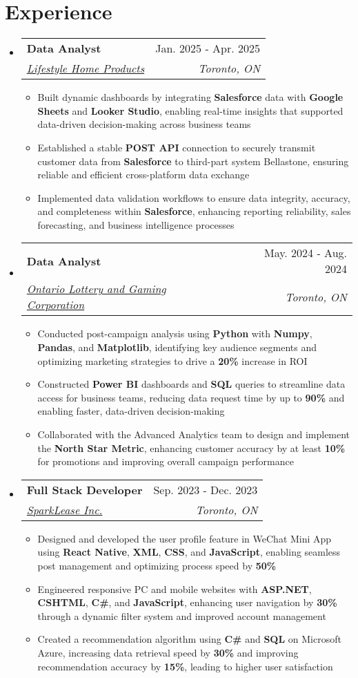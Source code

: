 \documentclass[letterpaper,11pt]{article}
\makeatletter
\newcommand{\resumeItem}[1]{
  \item\small{
    {#1 \vspace{-2pt}}
  }
}
\newcommand{\resumeSubheading}[4]{
  \vspace{-2pt}\item
    \begin{tabular*}{0.97\textwidth}[t]{l@{\extracolsep{\fill}}r}
      \textbf{#1} & #2 \\
      \textit{\small#3} & \textit{\small #4} \\
    \end{tabular*}\vspace{-7pt}
}
\newcommand{\resumeSubHeadingListStart}{\begin{itemize}[leftmargin=0.15in, label={}]}
\newcommand{\resumeSubHeadingListEnd}{\end{itemize}}
\newcommand{\resumeItemListStart}{\begin{itemize}}
\newcommand{\resumeItemListEnd}{\end{itemize}\vspace{-5pt}}
\makeatother
\begin{document}
\section{Experience}
  \resumeSubHeadingListStart
    \resumeSubheading
      {Data Analyst}{Jan. 2025 - Apr. 2025}
      {\href{https://lifestylesunrooms.com/}{Lifestyle Home Products}}{Toronto, ON}
      \resumeItemListStart
        \resumeItem{Built dynamic dashboards by integrating \textbf{Salesforce} data with \textbf{Google Sheets} and \textbf{Looker Studio}, enabling real-time insights that supported data-driven decision-making across business teams} 
        \resumeItem{Established a stable \textbf{POST API} connection to securely transmit customer data from \textbf{Salesforce} to third-part system Bellastone, ensuring reliable and efficient cross-platform data exchange}
        \resumeItem{Implemented data validation workflows to ensure data integrity, accuracy, and completeness within \textbf{Salesforce}, enhancing reporting reliability, sales forecasting, and business intelligence processes}
      \resumeItemListEnd

    \resumeSubheading
      {Data Analyst}{May. 2024 - Aug. 2024}
      {\href{https://www.olg.ca/en/home.html}{Ontario Lottery and Gaming Corporation}}{Toronto, ON}
      \resumeItemListStart
        \resumeItem{Conducted post-campaign analysis using \textbf{Python} with \textbf{Numpy}, \textbf{Pandas}, and \textbf{Matplotlib}, identifying key audience segments and optimizing marketing strategies to drive a \textbf{20\%} increase in ROI}
        \resumeItem{Constructed \textbf{Power BI} dashboards and \textbf{SQL} queries to streamline data access for business teams, reducing data request time by up to \textbf{90\%} and enabling faster, data-driven decision-making}
        \resumeItem{Collaborated with the Advanced Analytics team to design and implement the \textbf{North Star Metric}, enhancing customer accuracy by at least \textbf{10\%} for promotions and improving overall campaign performance}
      \resumeItemListEnd

    \resumeSubheading
      {Full Stack Developer}{Sep. 2023 - Dec. 2023}
      {\href{https://www.sparklease.com/en/Home/Index}{SparkLease Inc.}}{Toronto, ON}
      \resumeItemListStart
        \resumeItem{Designed and developed the user profile feature in WeChat Mini App using \textbf{React Native}, \textbf{XML}, \textbf{CSS}, and \textbf{JavaScript}, enabling seamless post management and optimizing process speed by \textbf{50\%}}
        \resumeItem{Engineered responsive PC and mobile websites with \textbf{ASP.NET}, \textbf{CSHTML}, \textbf{C\#}, and \textbf{JavaScript}, enhancing user navigation by \textbf{30\%} through a dynamic filter system and improved account management}
        \resumeItem{Created a recommendation algorithm using \textbf{C\#} and \textbf{SQL} on Microsoft Azure, increasing data retrieval speed by \textbf{30\%} and improving recommendation accuracy by \textbf{15\%}, leading to higher user satisfaction}
      \resumeItemListEnd
  \resumeSubHeadingListEnd
\end{document}
